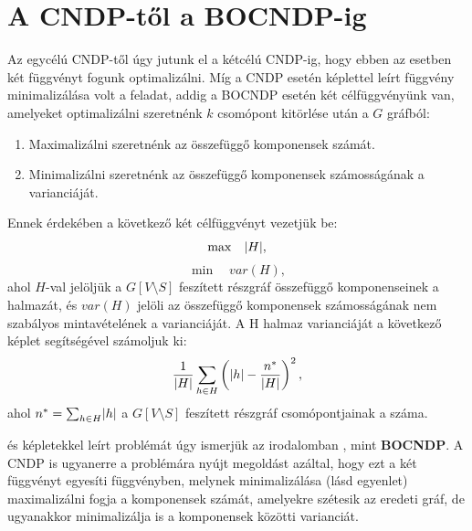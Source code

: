 \section{A CNDP-től a BOCNDP-ig}

Az egycélú CNDP-től úgy jutunk el a kétcélú CNDP-ig, hogy ebben az esetben két függvényt fogunk optimalizálni.
Míg a CNDP esetén  képlettel leírt függvény minimalizálása volt a feladat,
addig a BOCNDP esetén két célfüggvényünk van, amelyeket optimalizálni szeretnénk $k$ csomópont kitörlése után a $G$ gráfból:
\begin{enumerate}
  \item Maximalizálni szeretnénk az összefüggő komponensek számát.
  \item Minimalizálni szeretnénk az összefüggő komponensek számosságának a varianciáját.
\end{enumerate}
Ennek érdekében a következő két célfüggvényt vezetjük be:
\begin{equation}\label{eqn:MAX_CONNECTED_COMPONENTS}
  \max \quad \lvert H\rvert,
\end{equation}
\begin{equation}\label{eqn:MIN_CARDINALITY_VARIANCE_COMPONENTS}
  \min \quad var(H),
\end{equation}
ahol $H$-val jelöljük a $G\left[ V \setminus S \right]$ feszített részgráf összefüggő komponenseinek a halmazát,
és $var(H)$ jelöli az összefüggő komponensek számosságának nem szabályos mintavételének a varianciáját.
A H halmaz varianciáját a következő képlet segítségével számoljuk ki:
\begin{equation}\label{eqn:CARDINALITY_VARIANCE_COMPONENTS}
  \dfrac{1}{ \lvert H\rvert } \sum_{h \in H} \left( \lvert h\rvert - \dfrac{ n^{*} }{ \lvert H\rvert } \right)^{2},
\end{equation}
ahol $n^{*} = \sum_{h \in H} \lvert h\rvert$ a $G\left[ V \setminus S \right]$ feszített részgráf csomópontjainak a száma.

 és 
képletekkel leírt problémát úgy ismerjük az irodalomban \cite{ventresca2018bi}, mint \textbf{BOCNDP}.
A CNDP is ugyanerre a problémára nyújt megoldást azáltal,
hogy ezt a két függvényt egyesíti  függvényben,
melynek minimalizálása (lásd  egyenlet) maximalizálni fogja a komponensek számát, amelyekre szétesik az eredeti gráf,
de ugyanakkor minimalizálja is a komponensek közötti varianciát.

